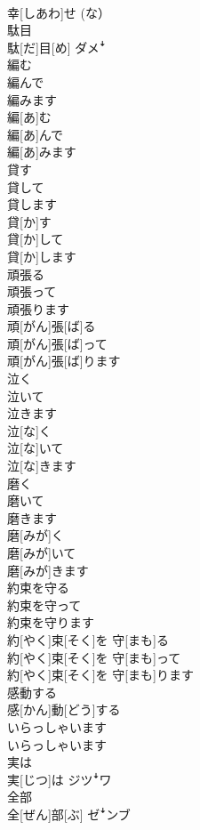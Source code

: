 \documentclass[8pt]{extreport}
\begin{document}
\begin{CJK}{UTF8}{min}
\\	幸[しあわ]せ (な）	
\\	駄目	
\\	駄[だ]目[め]	ダメꜜ
\\	編む 
\\	編んで 
\\	編みます	
\\	編[あ]む 
\\	編[あ]んで 
\\	編[あ]みます	
\\	貸す 
\\	貸して 
\\	貸します	
\\	貸[か]す 
\\	貸[か]して 
\\	貸[か]します	
\\	頑張る 
\\	頑張って 
\\	頑張ります	
\\	頑[がん]張[ば]る 
\\	頑[がん]張[ば]って 
\\	頑[がん]張[ば]ります	
\\	泣く 
\\	泣いて 
\\	泣きます	
\\	泣[な]く 
\\	泣[な]いて 
\\	泣[な]きます	
\\	磨く 
\\	磨いて 
\\	磨きます	
\\	磨[みが]く 
\\	磨[みが]いて 
\\	磨[みが]きます	
\\	約束を守る 
\\	約束を守って 
\\	約束を守ります	
\\	約[やく]束[そく]を 守[まも]る 
\\	約[やく]束[そく]を 守[まも]って 
\\	約[やく]束[そく]を 守[まも]ります	
\\	感動する	
\\	感[かん]動[どう]する	
\\	いらっしゃいます	
\\	いらっしゃいます	
\\	実は	
\\	実[じつ]は	ジツꜜワ
\\	全部	
\\	全[ぜん]部[ぶ]	ゼꜜンブ

\end{CJK}
\end{document}
